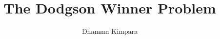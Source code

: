 \documentclass{article}
\theoremstyle{definition}
\begin{document}
\title{The Dodgson Winner Problem}
 \author{Dhamma Kimpara}

\maketitle













\newpage




\newpage

\appendix


\end{document}
